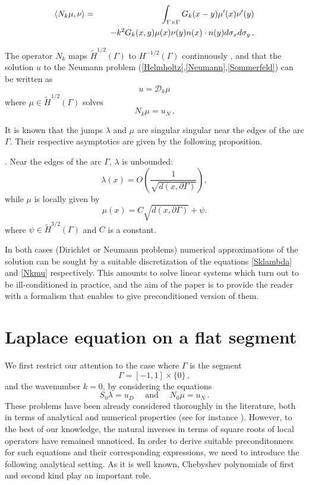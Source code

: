 \documentclass[a4paper]{article}
\begin{document}
\begin{eqnarray}
\label{NkenfonctiondeSk}
\left\langle N_k \mu,\nu\right\rangle &=& \int_{\Gamma\times \Gamma} G_k(x-y) \mu'(x) \nu'(y) \nonumber\\
&& \quad - k^2 G_k(x,y) \mu(x) \nu(y) n(x) \cdot n(y) d\sigma_x d\sigma_y\,.
\end{eqnarray}


The operator $N_k$ maps $\tilde{H}^{1/2}(\Gamma)$ to $H^{-1/2}(\Gamma)$ continuously \cite[Theorem 1.4]{wendland1990hypersingular}, and that the solution $u$ to the Neumann 
problem (\ref{Helmholtz},\ref{Neumann},\ref{Sommerfeld}) can be written as
\begin{equation}
	u = \mathcal{D}_k \mu
\end{equation}
where $\mu \in \tilde{H}^{1/2}(\Gamma)$ solves
\begin{equation}
	N_k \mu = u_N\,.
	\label{Nkmu}
\end{equation}  

It is known that the jumps $\lambda$ and $\mu$ are singular singular near the edges of the arc $\Gamma$. Their respective asymptotics are given by the following proposition.
 
\begin{proposition}
\cite{stephan1984augmented,wendland1990hypersingular,monch1996numerical}.
Near the edges of the arc $\Gamma$, $\lambda$ is unbounded:
	\[\lambda(x) = O\left(\frac{1}{\sqrt{d(x,\partial \Gamma)}}\right),\]
while $\mu$ is locally given by
	\[\mu(x) = C\sqrt{d(x,\partial \Gamma)} + \psi.\]
	where $\psi \in \tilde{H}^{3/2}(\Gamma)$ and $C$ is a constant.
\end{proposition}

In both cases (Dirichlet or Neumann problems) numerical approximations of the solution can be sought by a suitable 
discretization of the equations \eqref{Sklambda} and \eqref{Nkmu} respectively. This amounts to solve linear systems
which turn out to be ill-conditioned in practice, and the aim of the paper is to provide the reader with a formalism that 
enables to give preconditioned version of them.

	
\section{Laplace equation on a flat segment}

We first restrict our attention to the case where $\Gamma$ is the segment  
\[\Gamma = [-1,1] \times \{0\}\,,\]
and the wavenumber 
$k=0$, by considering the equations 
\[S_0\lambda = u_D \quad \text{ and } \quad N_0\mu = u_N\,.\]
These problems have been already considered thoroughly in the literature, both
in terms of analytical and numerical properties (see for instance \cite{jiang2004second,bruno2012second}). However, 
to the best of our knowledge, the natural inverses in terms of square roots of local operators have remained unnoticed. 
In order to derive suitable preconditonners for such equations and their corresponding expressions, we need to introduce 
the following analytical setting. As it is well known, Chebyshev polynomials of first and second kind play an important role.
\end{document}
